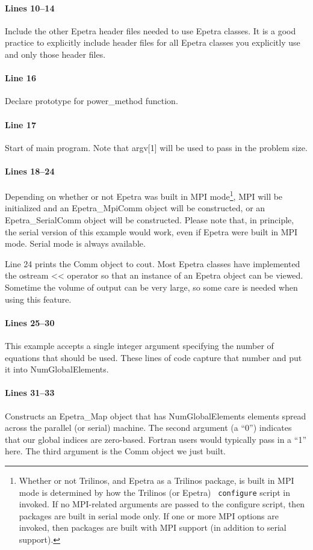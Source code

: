 \documentclass[12pt,relax]{EpetraUserGuide}
\newcommand{\serialcomm}{Epetra\_SerialComm}
\newcommand{\mpicomm}{Epetra\_MpiComm}
\newcommand{\map}{Epetra\_Map}
\begin{document}
\paragraph{Lines 10--14}
Include the other Epetra header files needed to use Epetra classes.
It is a good practice to explicitly include header files for all
Epetra classes you explicitly use and only those header files.
\paragraph{Line 16}
Declare prototype for power\_method function.
\paragraph{Line 17}
Start of main program.  Note that argv[1] will be used to pass in the
problem size.
\paragraph{Lines 18--24}
Depending on whether or not Epetra was built in MPI
mode\footnote{Whether or not Trilinos, and Epetra as a Trilinos package, is built
in MPI mode is determined by how the Trilinos (or Epetra) {\tt
configure} script in invoked.  If no MPI-related arguments are passed
to the configure script, then packages are built in serial mode only.
If one or more MPI options are invoked, then packages are built with
MPI support (in addition to serial support).}, MPI will be initialized
and an \mpicomm{} object will be constructed, or an \serialcomm{}
object will be constructed.  Please note that, in principle, the serial
version of this example would work, even if Epetra were built in MPI
mode.  Serial mode is always available.

Line 24 prints the Comm object to cout.  Most Epetra classes have
implemented the ostream << operator so that an instance of an Epetra
object can be viewed.  Sometime the volume of output can be very
large, so some care is needed when using this feature.
\paragraph{Lines 25--30}
This example accepts a single integer argument
specifying the number of equations that should be used.  These lines
of code capture that number and put it into NumGlobalElements.
\paragraph{Lines 31--33}
Constructs an \map{} object that has NumGlobalElements elements spread
across the parallel (or serial) machine.  The second argument (a
``0'') indicates that our global indices are zero-based.  Fortran
users would typically pass in a ``1'' here.  The third argument is the
Comm object we just built.
\end{document}

